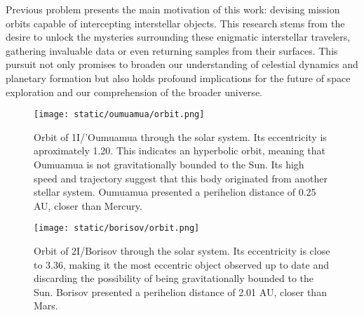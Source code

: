 Previous problem presents the main motivation of this work: devising mission
orbits capable of intercepting interstellar objects. This research stems from
the desire to unlock the mysteries surrounding these enigmatic interstellar
travelers, gathering invaluable data or even returning samples from their
surfaces. This pursuit not only promises to broaden our understanding of
celestial dynamics and planetary formation but also holds profound implications
for the future of space exploration and our comprehension of the broader
universe.

\newpage
\begin{figure}[H]
  \centering
  \texttt{[image: static/oumuamua/orbit.png]}
  \caption[Orbit of 1I/'Oumuamua through the solar system]{
    Orbit of 1I/'Oumuamua through the solar system. Its eccentricity is
    aproximately 1.20. This indicates an hyperbolic orbit, meaning that
    Oumuamua is not gravitationally bounded to the Sun. Its high speed and
    trajectory suggest that this body originated from another stellar system.
    Oumuamua presented a perihelion distance of 0.25 AU, closer than Mercury.
  }
  \label{fig:oumuamua_orbit}
\end{figure}

\begin{figure}[H]
  \centering
  \texttt{[image: static/borisov/orbit.png]}
  \caption[Orbit of 2I/Borisov through the solar system]{
    Orbit of 2I/Borisov through the solar system. Its eccentricity is
    close to 3.36, making it the most eccentric object observed up to date
    and discarding the possibility of being gravitationally bounded to the Sun.
    Borisov presented a perihelion distance of 2.01 AU, closer than Mars.
  }
  \label{fig:borisov_orbit}
\end{figure}
